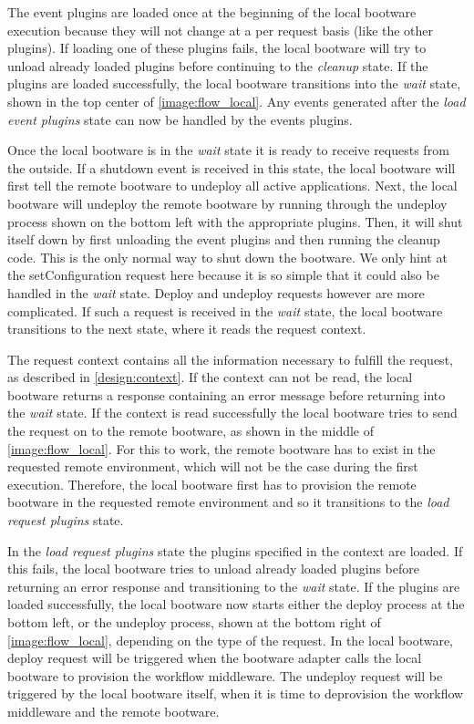 The event plugins are loaded once at the beginning of the local bootware execution because they will not change at a per request basis (like the other plugins).
If loading one of these plugins fails, the local bootware will try to unload already loaded plugins before continuing to the \textit{cleanup} state.
If the plugins are loaded successfully, the local bootware transitions into the \textit{wait} state, shown in the top center of \autoref{image:flow_local}.
Any events generated after the \textit{load event plugins} state can now be handled by the events plugins.

Once the local bootware is in the \textit{wait} state it is ready to receive requests from the outside.
If a shutdown event is received in this state, the local bootware will first tell the remote bootware to undeploy all active applications.
Next, the local bootware will undeploy the remote bootware by running through the undeploy process shown on the bottom left with the appropriate plugins.
Then, it will shut itself down by first unloading the event plugins and then running the cleanup code.
This is the only normal way to shut down the bootware.
We only hint at the setConfiguration request here because it is so simple that it could also be handled in the \textit{wait} state.
Deploy and undeploy requests however are more complicated.
If such a request is received in the \textit{wait} state, the local bootware transitions to the next state, where it reads the request context.

The request context contains all the information necessary to fulfill the request, as described in \autoref{design:context}.
If the context can not be read, the local bootware returns a response containing an error message before returning into the \textit{wait} state.
If the context is read successfully the local bootware tries to send the request on to the remote bootware, as shown in the middle of \autoref{image:flow_local}.
For this to work, the remote bootware has to exist in the requested remote environment, which will not be the case during the first execution.
Therefore, the local bootware first has to provision the remote bootware in the requested remote environment and so it transitions to the \textit{load request plugins} state.

In the \textit{load request plugins} state the plugins specified in the context are loaded.
If this fails, the local bootware tries to unload already loaded plugins before returning an error response and transitioning to the \textit{wait} state.
If the plugins are loaded successfully, the local bootware now starts either the deploy process at the bottom left, or the undeploy process, shown at the bottom right of \autoref{image:flow_local}, depending on the type of the request.
In the local bootware, deploy request will be triggered when the bootware adapter calls the local bootware to provision the workflow middleware.
The undeploy request will be triggered by the local bootware itself, when it is time to deprovision the workflow middleware and the remote bootware.


